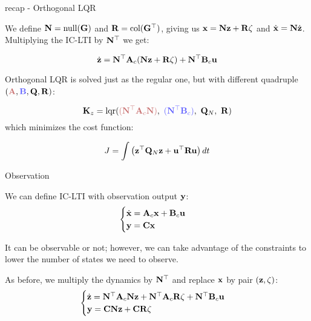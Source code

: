 \documentclass{beamer}
\begin{document}
\begin{frame}{recap - Orthogonal LQR}
	\begin{flushleft}
		
		We define $\mathbf{N} = \text{null}(\mathbf{G})$ and $\mathbf{R} = \text{col}(\mathbf{G}^\top)$, giving us $\mathbf{x} = \mathbf{N}\mathbf{z}+\mathbf{R}\zeta$ and $\dot{\mathbf{x}} = \mathbf{N}\dot{\mathbf{z}}$. Multiplying the IC-LTI by $\mathbf{N}^\top$ we get:
		
		\begin{equation}
			\dot{\mathbf{z}}=\mathbf{N}^\top\mathbf{A}_c(\mathbf{N}\mathbf{z}+\mathbf{R}\zeta)+\mathbf{N}^\top\mathbf{B}_c\mathbf{u}
		\end{equation}
		
		Orthogonal LQR is solved just as the regular one, but with different quadruple $(\textcolor{myred}{\bo{A}}, \textcolor{myblue}{\bo{B}}, \bo{Q}, \bo{R})$:
		
		\begin{equation}
			\bo{K}_z = \text{lqr}(\textcolor{myred}{(\bo{N}\T\bo{A}_c\bo{N})}, \ \textcolor{myblue}{(\bo{N}\T\bo{B}_c)}, \ \bo{Q}_N, \ \bo{R})
		\end{equation}
		which minimizes the cost function:
	
		\begin{equation}
			J = \int \left ( \mathbf{z}^\top \mathbf{Q}_N \mathbf{z} + \mathbf{u}^\top \mathbf{R} \mathbf{u} \right ) dt
		\end{equation}
		
		
	\end{flushleft}
\end{frame}



\begin{frame}{Observation}
	\begin{flushleft}
		
		We can define IC-LTI with observation output $\mathbf{y}$:
		\begin{equation}
			\begin{cases}
				\dot{\mathbf{x}}=\mathbf{A}_c\mathbf{x}+\mathbf{B}_c\mathbf{u}
				\\
				\mathbf{y} = \mathbf{C}\mathbf{x}
			\end{cases}
	\end{equation}

	It can be observable or not; however, we can take advantage of the constraints to lower the number of states we need to observe.
	
	\bigskip
	
	As before, we multiply the dynamics by $\mathbf{N}^\top$ and replace $\mathbf{x}$ by pair $(\mathbf{z}, \zeta)$:
	\begin{equation}
		\begin{cases}
			\dot{\mathbf{z}}=\mathbf{N}^\top\mathbf{A}_c\mathbf{N}\mathbf{z} + \mathbf{N}^\top\mathbf{A}_c\mathbf{R}\zeta + \mathbf{N}^\top\mathbf{B}_c\mathbf{u}
			\\
			\mathbf{y} = \mathbf{C}\mathbf{N}\mathbf{z} + \mathbf{C}\mathbf{R}\zeta
		\end{cases}
	\end{equation}
		
	\end{flushleft}
\end{frame}
\end{document}
